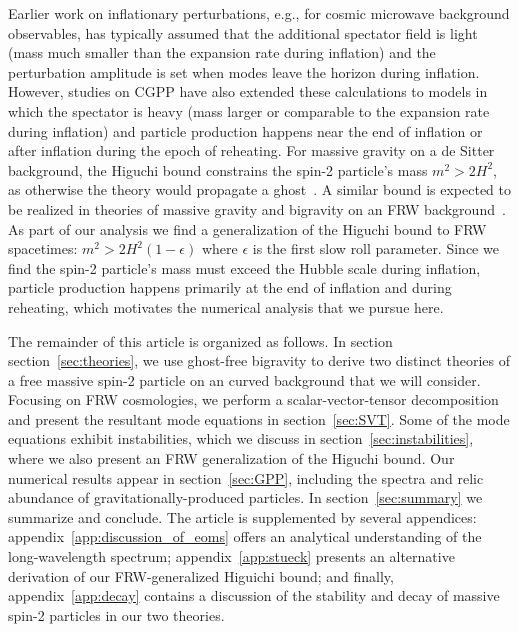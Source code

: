 \documentclass[11pt,a4paper]{article}
\newcommand{\sref}[1]{section~\ref{#1}}
\newcommand{\aref}[1]{appendix~\ref{#1}}
\begin{document}
Earlier work on inflationary perturbations, e.g., for cosmic microwave background observables, has typically assumed that the additional spectator field is light (mass much smaller than the expansion rate during inflation) and the perturbation amplitude is set when modes leave the horizon during inflation.  However, studies on CGPP have also extended these calculations to models in which the spectator is heavy (mass larger or comparable to the expansion rate during inflation) and  particle production happens near the end of inflation or after inflation during the epoch of reheating.  For massive gravity on a de Sitter background, the Higuchi bound constrains the spin-2 particle's mass $m^2 > 2 H^2$, as otherwise the theory would propagate a ghost~\cite{Higuchi:1986py}.  A similar bound is expected to be realized in theories of massive gravity and bigravity on an FRW background~\cite{Fasiello:2012rw,Fasiello:2013woa}.  As part of our analysis we find a generalization of the Higuchi bound to FRW spacetimes: $m^2 > 2 H^2 (1 - \epsilon)$ where $\epsilon$ is the first slow roll parameter. Since we find the spin-2 particle's mass must exceed the Hubble scale during inflation, particle production happens primarily at the end of inflation and during reheating, which motivates the numerical analysis that we pursue here.  

The remainder of this article is organized as follows.  In section \sref{sec:theories}, we use ghost-free bigravity to derive two distinct theories of a free massive spin-2 particle on an curved background that we will consider.  
Focusing on FRW cosmologies, we perform a scalar-vector-tensor decomposition and present the resultant mode equations in \sref{sec:SVT}.  Some of the mode equations exhibit instabilities, which we discuss in \sref{sec:instabilities}, where we also present an FRW generalization of the Higuchi bound.  Our numerical results appear in \sref{sec:GPP}, including the spectra and relic abundance of gravitationally-produced particles.  In \sref{sec:summary} we summarize and conclude.  The article is supplemented by several appendices: \aref{app:discussion_of_eoms} offers an analytical understanding of the long-wavelength spectrum; \aref{app:stueck} presents an alternative derivation of our FRW-generalized Higuichi bound; and finally, \aref{app:decay} contains a discussion of the stability and decay of massive spin-2 particles in our two theories. 

\end{document}
